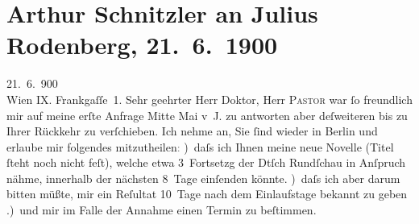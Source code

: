 

         
         \renewcommand{\erwaehntePersonen}{Personen: Willy Pastor, Julius Rodenberg}
         \renewcommand{\erwaehnteInstitutionen}{Institutionen: Deutsche Rundschau}
         \renewcommand{\erwaehnteOrte}{Orte: Berlin, Frankgasse, Wien}
         \renewcommand{\erwaehnteWerke}{Werke: Frau Bertha Garlan. Roman}
               \section[Arthur Schnitzler an Julius Rodenberg, 21. 6. 1900]{ Arthur Schnitzler an Julius Rodenberg, 21. 6. 1900}\nopagebreak{}\rehead{ }\begin{ledgroupsized}[t]{13cm}\normalsize\beginnumbering \toendnotes[C]{\smallbreak\pagebreak[2]} 
\toendnotes[C]{\smallbreak}\pstart
           \raggedleft{}{\pb}21. 6. 900{\\}Wien IX. Frankgaſſe 1.\pend
           \pstart{}Sehr geehrter Herr Doktor,\pend\pstart
           Herr \textsc{Pastor} war ſo freundlich mir auf meine erſte Anfrage Mitte Mai v J.
                    zu antworten aber deſweiteren bis zu Ihrer Rückkehr zu verſchieben. Ich nehme
                    an, Sie ſind wieder in Berlin und erlaube mir
                    folgendes mitzutheilen\textcolor{gray}{:}\pend
           ) daſs ich Ihnen meine neue Novelle (Titel ſteht noch nicht {\pb}feſt), welche etwa 3 Fortsetzg der Dtſch
                        Rundſchau in Anſpruch nähme, innerhalb der nächsten 8 Tage einſenden
                    könnte.\pend
           ) daſs ich aber darum bitten müßte, mir ein Reſultat  10 Tage nach dem Einlaufstage bekannt zu
                    geben\pend
           .) und mir im Falle der Annahme einen Termin zu {\pb}beſtimmen.\pend

\end{ledgroupsized}
